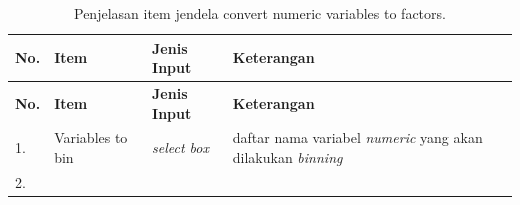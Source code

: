 \documentclass[12pt,]{krantz}
\begin{document}
\begin{longtable}[]{@{}llll@{}}
\caption{\label{tab:binvartab} Penjelasan item jendela convert numeric variables to factors.}\tabularnewline
\toprule
\begin{minipage}[b]{0.04\columnwidth}\raggedright
\textbf{No.}\strut
\end{minipage} & \begin{minipage}[b]{0.14\columnwidth}\raggedright
\textbf{Item}\strut
\end{minipage} & \begin{minipage}[b]{0.09\columnwidth}\raggedright
\textbf{Jenis Input}\strut
\end{minipage} & \begin{minipage}[b]{0.61\columnwidth}\raggedright
\textbf{Keterangan}\strut
\end{minipage}\tabularnewline
\midrule
\endfirsthead
\toprule
\begin{minipage}[b]{0.04\columnwidth}\raggedright
\textbf{No.}\strut
\end{minipage} & \begin{minipage}[b]{0.14\columnwidth}\raggedright
\textbf{Item}\strut
\end{minipage} & \begin{minipage}[b]{0.09\columnwidth}\raggedright
\textbf{Jenis Input}\strut
\end{minipage} & \begin{minipage}[b]{0.61\columnwidth}\raggedright
\textbf{Keterangan}\strut
\end{minipage}\tabularnewline
\midrule
\endhead
\begin{minipage}[t]{0.04\columnwidth}\raggedright
1.\strut
\end{minipage} & \begin{minipage}[t]{0.14\columnwidth}\raggedright
Variables to bin\strut
\end{minipage} & \begin{minipage}[t]{0.09\columnwidth}\raggedright
\emph{select box}\strut
\end{minipage} & \begin{minipage}[t]{0.61\columnwidth}\raggedright
daftar nama variabel \emph{numeric} yang akan dilakukan \emph{binning}\strut
\end{minipage}\tabularnewline
\begin{minipage}[t]{0.04\columnwidth}\raggedright
2.\strut
\end{minipage} & \begin{minipage}[t]{0.14\columnwidth}\raggedright

\end{minipage}
\end{longtable}
\end{document}
